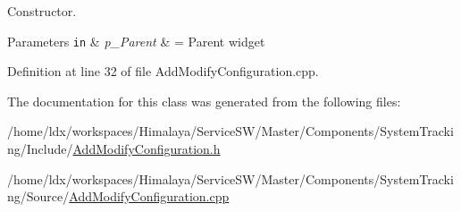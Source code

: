 \-Constructor. 


\begin{DoxyParams}[1]{\-Parameters}
\mbox{\tt in}  & {\em p\-\_\-\-Parent} & = \-Parent widget \\
\hline
\end{DoxyParams}


\-Definition at line 32 of file \-Add\-Modify\-Configuration.\-cpp.



\-The documentation for this class was generated from the following files\-:\begin{DoxyCompactItemize}
\item 
/home/ldx/workspaces/\-Himalaya/\-Service\-S\-W/\-Master/\-Components/\-System\-Tracking/\-Include/\hyperlink{AddModifyConfiguration_8h}{\-Add\-Modify\-Configuration.\-h}\item 
/home/ldx/workspaces/\-Himalaya/\-Service\-S\-W/\-Master/\-Components/\-System\-Tracking/\-Source/\hyperlink{AddModifyConfiguration_8cpp}{\-Add\-Modify\-Configuration.\-cpp}\end{DoxyCompactItemize}
